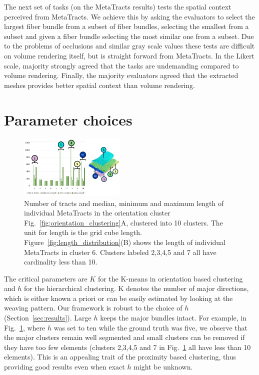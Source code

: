 The next set of tasks (on the MetaTracts results) tests the spatial context perceived from MetaTracts. We achieve this by asking the evaluators to select the largest fiber bundle from a subset of fiber bundles, selecting the smallest from a subset and given a fiber bundle selecting the most similar one from a subset. Due to the problems of occlusions and similar gray scale values these tests are difficult on volume rendering itself, but is straight forward from MetaTracts. In the Likert scale,  majority strongly agreed that the tasks are undemanding compared to volume rendering.
Finally, the majority evaluators agreed that the extracted meshes provides better spatial context than volume rendering. 
 
\section{Parameter choices}
\label{sec:param_choices}
\begin{figure}
\centering
	\includegraphics[width=0.45\textwidth,  trim = 0mm 260mm 0mm 15mm, clip]{images_pvis/figure9}
	\caption{Number of tracts and median, minimum and maximum length of individual MetaTracts in the orientation cluster Fig.~\ref{fig:orientation_clustering}A, clustered into 10 clusters. The unit for length is the grid cube length. Figure~\ref{fig:length_distribution}(B) shows the length of individual MetaTracts in cluster 6. Clusters labeled 2,3,4,5 and 7 all have cardinality less than 10. }
	\label{fig:len_dist_crop16}
\end{figure}
The critical parameters are $K$ for the K-means in orientation based clustering and $h$ for the hierarchical clustering. K denotes the number of major directions, which is either known a priori or can be easily estimated by looking at the weaving pattern. 
Our framework is robust to the choice of $h$ (Section~\ref{sec:results}). Large $h$ keeps the major bundles intact. For example, in  Fig.~\ref{fig:len_dist_crop16}, where $h$ was set to ten while the ground truth was five, we observe that the major clusters remain well segmented and small clusters can be removed if they have too few elements (clusters 2,3,4,5 and 7 in Fig.~\ref{fig:len_dist_crop16} all have less than 10 elements). This is an appealing trait of the proximity based clustering, thus providing good results even when exact $h$ might be unknown.
